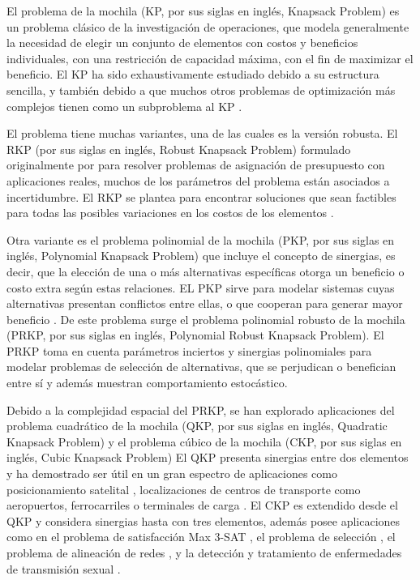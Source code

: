 \documentclass[spanish, a4paper, 12pt, twoside, openany,final]{book}
\numberwithin{equation}{section}                %
\begin{document}
El problema de la mochila (KP, por sus siglas en inglés, Knapsack Problem) es un problema clásico de la investigación de operaciones, que modela generalmente la necesidad de elegir un conjunto de elementos con costos y beneficios individuales, con una restricción de capacidad máxima, con el fin de maximizar el beneficio. El KP ha sido exhaustivamente estudiado debido a su estructura sencilla, y también debido a que muchos otros problemas de optimización más complejos tienen como un subproblema al KP \citep*{martello_knapsack_1990}.

El problema tiene muchas  variantes, una de las cuales es la versión robusta. El RKP (por sus siglas en inglés, Robust Knapsack Problem) formulado originalmente por \cite{eilon_application_1987} para resolver problemas de asignación de presupuesto con aplicaciones reales, muchos de los parámetros del problema están asociados a incertidumbre. El RKP se plantea para encontrar soluciones que sean factibles para todas las posibles variaciones en los costos de los elementos \citep{monaci_exact_2013}.

Otra variante es el problema polinomial de la mochila (PKP, por sus siglas en inglés, Polynomial Knapsack Problem) que incluye el concepto de sinergias, es decir, que la elección de una o más alternativas específicas otorga un beneficio o costo extra según estas relaciones. EL PKP sirve para modelar sistemas cuyas alternativas presentan conflictos entre ellas, o que cooperan para generar mayor beneficio \citep{baldo_polynomial_2023}. De este problema surge el problema polinomial robusto de la mochila (PRKP, por sus siglas en inglés, Polynomial Robust Knapsack Problem). El PRKP toma en cuenta parámetros inciertos y sinergias polinomiales para modelar problemas de selección de alternativas, que se perjudican o benefician entre sí y además muestran comportamiento estocástico.

Debido a la complejidad espacial del PRKP, se han explorado aplicaciones del problema cuadrático de la mochila (QKP, por sus siglas en inglés, Quadratic Knapsack Problem) \citep{gallo_quadratic_1980} y el problema cúbico de la mochila (CKP, por sus siglas en inglés, Cubic Knapsack Problem) \citep{forrester_strengthening_2022} El QKP presenta sinergias entre dos elementos y ha demostrado ser útil en un gran espectro de aplicaciones como posicionamiento satelital \citep{witzgall_mathematical_1975}, localizaciones de centros de transporte como aeropuertos, ferrocarriles o terminales de carga \citep{rhys_selection_1970}. El CKP es extendido desde el QKP y considera sinergias hasta con tres elementos, además posee aplicaciones como en el problema de satisfacción Max 3-SAT \citep{kofler_penalty_2014}, el problema de selección \citep{gallo_fast_1989}, el problema de alineación de redes \citep{mohammadi_triangular_2017}, y la detección y tratamiento de enfermedades de transmisión sexual \citep{zhao_treatments_2008}.
\end{document}
